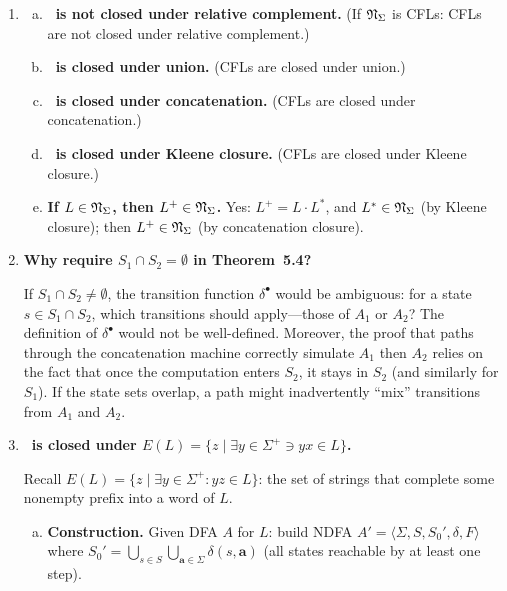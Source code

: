 \begin{enumerate}[{5.}1. ]
\begin{enumerate}[(a)]
  \item \textbf{Was this used in Theorem~5.2?}  Yes, implicitly: the proof that $L(A^\cup)=L_1\cup L_2$ relies on the fact that paths starting in $S_1$ stay in $S_1$ and paths starting in $S_2$ stay in $S_2$, which is exactly this lemma.
\end{enumerate}

\item \begin{enumerate}[(a)]
  \item \textbf{\NSIG\ is not closed under relative complement.}  (If $\mathfrak{N}_\Sigma$ is CFLs: CFLs are not closed under relative complement.)
  \item \textbf{\NSIG\ is closed under union.}  (CFLs are closed under union.)
  \item \textbf{\NSIG\ is closed under concatenation.}  (CFLs are closed under concatenation.)
  \item \textbf{\NSIG\ is closed under Kleene closure.}  (CFLs are closed under Kleene closure.)
  \item \textbf{If $L\in\mathfrak{N}_\Sigma$, then $L^+\in\mathfrak{N}_\Sigma$.}  Yes: $L^+=L\cdot L^*$, and $L^*\in\mathfrak{N}_\Sigma$ (by Kleene closure); then $L^+\in\mathfrak{N}_\Sigma$ (by concatenation closure).
\end{enumerate}

\item \textbf{Why require $S_1\cap S_2=\emptyset$ in Theorem~5.4?}

If $S_1\cap S_2\neq\emptyset$, the transition function $\delta^\bullet$ would be ambiguous: for a state $s\in S_1\cap S_2$, which transitions should apply---those of $A_1$ or $A_2$?  The definition of $\delta^\bullet$ would not be well-defined.  Moreover, the proof that paths through the concatenation machine correctly simulate $A_1$ then $A_2$ relies on the fact that once the computation enters $S_2$, it stays in $S_2$ (and similarly for $S_1$).  If the state sets overlap, a path might inadvertently ``mix'' transitions from $A_1$ and $A_2$.

\item \textbf{\DSIG\ is closed under $E(L)=\{z\mid\exists y\in\Sigma^+\ni yx\in L\}$.}

Recall $E(L)=\{z\mid\exists y\in\Sigma^+: yz\in L\}$: the set of strings that complete some nonempty prefix into a word of $L$.

\begin{enumerate}[(a)]
  \item \textbf{Construction.}  Given DFA $A$ for $L$: build NDFA $A'=\langle\Sigma,S,S_0',\delta,F\rangle$ where $S_0'=\bigcup_{s\in S}\bigcup_{\pmb{a}\in\Sigma}\delta(s,\pmb{a})$ (all states reachable by at least one step).


\end{enumerate}
\end{enumerate}
